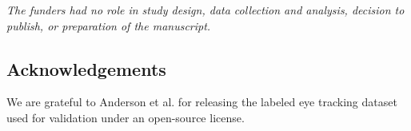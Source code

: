 \documentclass[10pt,a4paper]{extarticle}
\begin{document}
\textit{The funders had no role in study design, data collection and analysis,
decision to publish, or preparation of the manuscript.}

\subsection*{Acknowledgements}
We are grateful to Anderson et al. \cite{Andersson2017} for releasing the labeled
eye tracking dataset used for validation under an open-source license.

{\small
}








\end{document}
